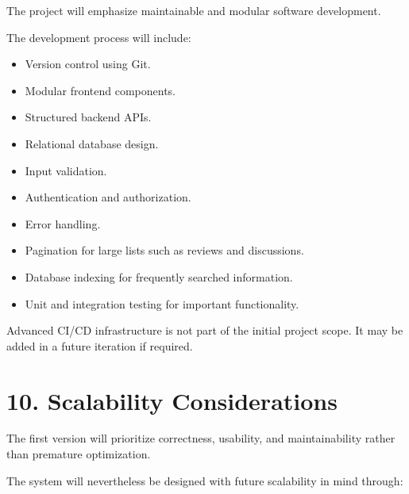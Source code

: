 \documentclass[11pt,a4paper]{article}
\begin{document}
The project will emphasize maintainable and modular software development.

The development process will include:

\begin{itemize}

    \item Version control using Git.

    \item Modular frontend components.

    \item Structured backend APIs.

    \item Relational database design.

    \item Input validation.

    \item Authentication and authorization.

    \item Error handling.

    \item Pagination for large lists such as reviews and discussions.

    \item Database indexing for frequently searched information.

    \item Unit and integration testing for important functionality.

\end{itemize}

Advanced CI/CD infrastructure is not part of the initial project scope. It may be added in a future iteration if required.



\section{10. Scalability Considerations}

The first version will prioritize correctness, usability, and maintainability rather than premature optimization.

The system will nevertheless be designed with future scalability in mind through:
\end{document}
